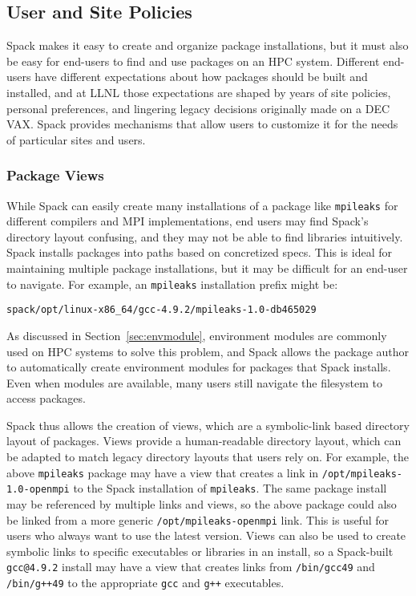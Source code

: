 
\subsection{User and Site Policies}
\label{sec:usecase-policy}

Spack makes it easy to create and organize package installations,
but it must also be easy for end-users to find and use packages on an HPC
system. Different end-users have different expectations about how packages
should be built and installed, and at LLNL those expectations are shaped
by years of site policies, personal preferences, and lingering legacy
decisions originally made on a DEC VAX.
Spack provides mechanisms that allow users to customize it for the needs
of particular sites and users.


\subsubsection{Package Views}
\label{sec:package-views}

While Spack can easily create many installations of a package like {\tt mpileaks}
for different compilers and MPI implementations, end users may find Spack's directory layout confusing, and they may not be able to find libraries intuitively.
Spack installs packages into paths based on concretized specs.
This is ideal for maintaining multiple package installations,
but it may be difficult for an end-user to navigate.
For example, an {\tt mpileaks} installation prefix might be:
%
\begin{verbatim}
spack/opt/linux-x86_64/gcc-4.9.2/mpileaks-1.0-db465029
\end{verbatim}

As discussed in Section~\ref{sec:envmodule},
environment modules are commonly used on HPC systems to solve this problem,
and Spack allows the package author to automatically create environment modules
for packages that Spack installs.
Even when modules are available, many users still
navigate the filesystem to access packages.

Spack thus allows the creation of views, which are a symbolic-link based directory layout of packages.
Views provide a human-readable directory layout,
which can be adapted to match legacy directory layouts that users rely on.
For example, the above {\tt mpileaks} package may have a view that creates a link in
{\tt /opt/mpileaks-1.0-openmpi} to the Spack installation of {\tt mpileaks}.
The same package install may be referenced by multiple links and views,
so the above package could also be linked from a more generic {\tt /opt/mpileaks-openmpi}
link. This is useful for users who always want to use the latest version.
Views can also be used to create symbolic links to specific executables or libraries in an install,
so a Spack-built {\tt gcc@4.9.2} install may have a view that creates links from
{\tt /bin/gcc49} and {\tt /bin/g++49} to the appropriate {\tt gcc} and {\tt g++} executables.

